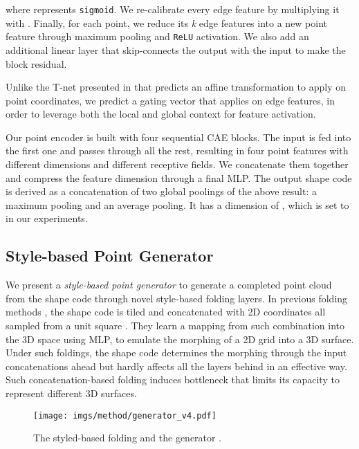 \documentclass[final]{cvpr}
\begin{document}
where  represents \texttt{sigmoid}.
We re-calibrate every edge feature  by multiplying it with .
Finally, for each point, we reduce its \emph{k} edge features into a new point feature through maximum pooling and \texttt{ReLU} activation.
We also add an additional linear layer  that skip-connects the output with the input to make the block residual.

Unlike the T-net presented in \cite{qi2017pointnet} that predicts an affine transformation to apply on point coordinates,
we predict a gating vector that applies on edge features, in order to leverage both the local and global context for feature activation.

Our point encoder  is built with four sequential CAE blocks. The input  is fed into the first one and passes through all the rest, resulting in four point features with different dimensions and different receptive fields. We concatenate them together and compress the feature dimension through a final MLP. The output shape code  is derived as a concatenation of two global poolings of the above result: a maximum pooling and an average pooling. It has a dimension of , which is set to  in our experiments.





\subsection{Style-based Point Generator} 
\label{ssec:generator}


We present a \emph{style-based point generator}  to generate a completed point cloud from the shape code  through novel style-based folding layers.
In previous folding methods \cite{foldingnet_2018_CVPR,Yuan-2018-pcn,atlasnet2018,liu2019morphing}, the shape code is tiled and concatenated with  2D coordinates all sampled from a unit square . They learn a mapping from such combination into the 3D space using MLP, to emulate the morphing of a 2D grid into a 3D surface. Under such foldings, the shape code determines the morphing through the input concatenations ahead but hardly affects all the layers behind in an effective way. Such concatenation-based folding induces bottleneck that limits its capacity to represent different 3D surfaces.

\begin{figure}[t]
\centering
\texttt{[image: imgs/method/generator\_v4.pdf]}
 \footnotesize
    \caption{The styled-based folding and the generator .}
\label{fig:generator}
\vspace{-1em}
\end{figure}
\end{document}
